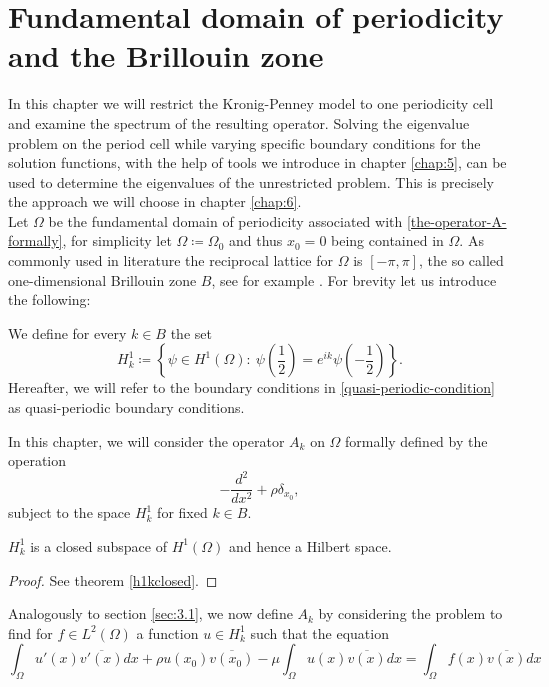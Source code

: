 \chapter{Fundamental domain of periodicity and the Brillouin zone}  \label{chap:4}

In this chapter we will restrict the Kronig-Penney model to one periodicity cell and examine the spectrum of the resulting operator. Solving the eigenvalue problem on the period cell while varying specific boundary conditions for the solution functions, with the help of tools we introduce in chapter \ref{chap:5}, can be used to determine the eigenvalues of the unrestricted problem. This is precisely the approach we will choose in chapter \ref{chap:6}.
~\\ 

Let $\Omega$ be the fundamental domain of periodicity associated with \eqref{the-operator-A-formally}, for simplicity let $\Omega \coloneqq \Omega_{0}$ and thus $x_{0} = 0$ being contained in $\Omega$. As commonly used in literature the reciprocal lattice for $\Omega$ is $[-\pi, \pi]$, the so called one-dimensional Brillouin zone $B$, see for example \cite[chapter 3]{dorfler2011photonic}. For brevity let us introduce the following:
\begin{definition} 
	We define for every $k \in B$ the set  
	\begin{equation} 
		H^{1}_{k} \coloneqq \left\{ \psi \in H^{1}(\Omega): ~ \psi\left(\frac{1}{2}\right) = e^{ik} \psi\left(-\frac{1}{2}\right) \right\}. \label{quasi-periodic-condition}
	\end{equation}
	Hereafter, we will refer to the boundary conditions in \eqref{quasi-periodic-condition} as quasi-periodic boundary conditions.
\end{definition}
In this chapter, we will consider the operator $A_{k}$ on $\Omega$ formally defined by the operation 
	\[ -\frac{d^{2}}{dx^{2}} + \rho \delta_{x_{0}}, \]
subject to the space $H^{1}_{k}$ for fixed $k \in B$.
	
\begin{remark}
	$H^{1}_{k}$ is a closed subspace of $H^{1}(\Omega)$ and hence a Hilbert space.
\end{remark}

\begin{proof}
	See theorem \ref{h1kclosed}.
\end{proof}

Analogously to section \ref{sec:3.1}, we now define $A_{k}$ by considering the problem to find for $f \in L^{2}(\Omega)$ a function $u \in H^{1}_{k}$ such that the equation
	\begin{equation}
		\int_{\Omega} u'(x) \overline{v'(x)} dx + \rho u(x_{0}) \overline{v(x_{0})} - \mu \int_{\Omega} u(x) \overline{v(x)} dx = \int_{\Omega} f(x) \overline{v(x)} dx \label{weak-formulation-to-the-restricted}
	\end{equation}

